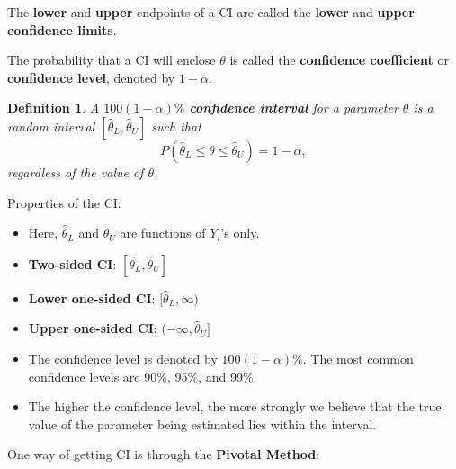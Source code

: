\documentclass[a4paper,12pt]{article}
\theoremstyle{nonitalic}
\newtheorem{definition}{Definition}[subsection]
\begin{document}
    The \textbf{lower} and \textbf{upper} endpoints of a CI are called the \textbf{lower} and \textbf{upper confidence limits}.

    The probability that a CI will enclose \(\theta\) is called the \textbf{confidence coefficient} or \textbf{confidence level}, denoted by \(1 - \alpha\).

    \bigskip

    \begin{definition}
        A \(100(1 - \alpha)\%\) \textbf{confidence interval} for a parameter \(\theta\) is a random interval \([\hat{\theta}_L, \hat{\theta}_U]\) such that 
        \[
        P\left( \hat{\theta}_L \leq \theta \leq \hat{\theta}_U \right) = 1 - \alpha,
        \]
        regardless of the value of \(\theta\).
    \end{definition}
        
    Properties of the CI:
        
    \begin{itemize}
        \item Here, \(\hat{\theta}_L\) and \(\hat{\theta}_U\) are functions of \(Y_i\)'s only.
        \item \textbf{Two-sided CI}: \([\hat{\theta}_L, \hat{\theta}_U]\)
        \item \textbf{Lower one-sided CI}: \([\hat{\theta}_L, \infty)\)
        \item \textbf{Upper one-sided CI}: \((-\infty, \hat{\theta}_U]\)
        \item The confidence level is denoted by \(100(1 - \alpha)\%\). The most common confidence levels are 90\%, 95\%, and 99\%.
        \item The higher the confidence level, the more strongly we believe that the true value of the parameter being estimated lies within the interval.
    \end{itemize}

    \bigskip

    One way of getting CI is through the \textbf{Pivotal Method}:
\end{document}
